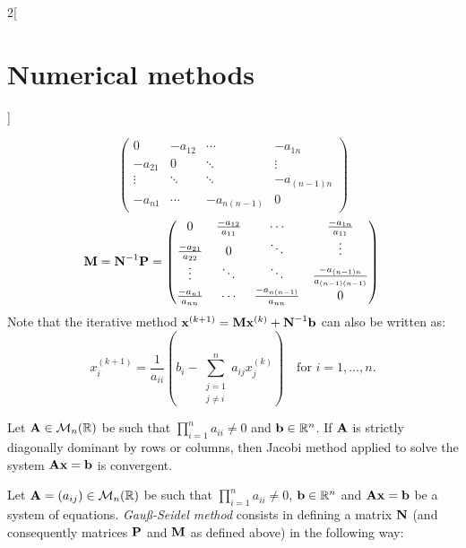 \documentclass[../../../main.tex]{subfiles}
\begin{document}
\begin{multicols}{2}[\section{Numerical methods}]
\begin{definition}
\begin{equation*}
      \begin{pmatrix}
        0       & -a_{12} & \cdots      & -a_{1n}     \\
        -a_{21} & 0       & \ddots      & \vdots      \\
        \vdots  & \ddots  & \ddots      & -a_{(n-1)n} \\
        -a_{n1} & \cdots  & -a_{n(n-1)} & 0
      \end{pmatrix}
    \end{equation*}
    \begin{equation*}
      \boldsymbol{\mathrm{M}}=\boldsymbol{\mathrm{N}}^{-1}\boldsymbol{\mathrm{P}}=
      \begin{pmatrix}
        0                      & \frac{-a_{12}}{a_{11}} & \cdots                     & \frac{-a_{1n}}{a_{11}}             \\
        \frac{-a_{21}}{a_{22}} & 0                      & \ddots                     & \vdots                             \\
        \vdots                 & \ddots                 & \ddots                     & \frac{-a_{(n-1)n}}{a_{(n-1)(n-1)}} \\
        \frac{-a_{n1}}{a_{nn}} & \cdots                 & \frac{-a_{n(n-1)}}{a_{nn}} & 0
      \end{pmatrix}\\
    \end{equation*}
    Note that the iterative method $\boldsymbol{\mathrm{x}}^{(k+1)}=\boldsymbol{\mathrm{M}}\boldsymbol{\mathrm{x}}^{(k)}+\boldsymbol{\mathrm{N}}^{-1}\boldsymbol{\mathrm{b}}$ can also be written as: $$x_i^{(k+1)}=\frac{1}{a_{ii}}\left(b_i-\sum_{\substack{j=1\\j\ne i}}^na_{ij}x_j^{(k)}\right)\quad\text{for }i=1,\ldots,n.$$
  \end{definition}
  \begin{theorem}
    Let $\boldsymbol{\mathrm{A}}\in\mathcal{M}_n(\mathbb{R})$ be such that $\prod_{i=1}^na_{ii}\ne 0$ and $\boldsymbol{\mathrm{b}}\in\mathbb{R}^n$. If $\boldsymbol{\mathrm{A}}$ is strictly diagonally dominant by rows or columns, then Jacobi method applied to solve the system $\boldsymbol{\mathrm{A}}\boldsymbol{\mathrm{x}}=\boldsymbol{\mathrm{b}}$ is convergent.
  \end{theorem}
  \begin{definition}
    Let $\boldsymbol{\mathrm{A}}=(a_{ij})\in\mathcal{M}_n(\mathbb{R})$ be such that $\prod_{i=1}^na_{ii}\ne 0$, $\boldsymbol{\mathrm{b}}\in\mathbb{R}^n$ and $\boldsymbol{\mathrm{A}}\boldsymbol{\mathrm{x}}=\boldsymbol{\mathrm{b}}$ be a system of equations. \textit{Gau\ss-Seidel method} consists in defining a matrix $\boldsymbol{\mathrm{N}}$ (and consequently matrices $\boldsymbol{\mathrm{P}}$ and $\boldsymbol{\mathrm{M}}$ as defined above) in the following way:

\end{definition}
\end{multicols}
\end{document}
